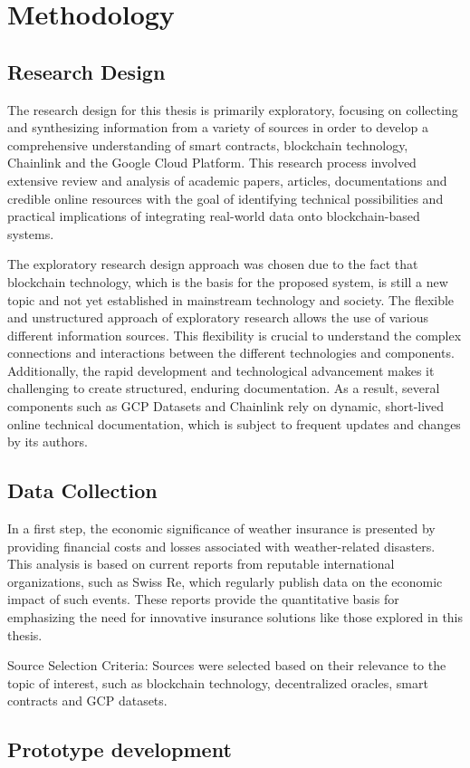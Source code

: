 \chapter{Methodology}\label{chapter:methodology}
\section{Research Design}\label{section:research_design}

The research design for this thesis is primarily exploratory, focusing on collecting and synthesizing information from a variety of sources in order to develop a comprehensive understanding of smart contracts, blockchain technology, Chainlink and the Google Cloud Platform. This research process involved extensive review and analysis of academic papers, articles, documentations and credible online resources with the goal of identifying technical possibilities and practical implications of integrating real-world data onto blockchain-based systems.

The exploratory research design approach was chosen due to the fact that blockchain technology, which is the basis for the proposed system, is still a new topic and not yet established in mainstream technology and society. The flexible and unstructured approach of exploratory research allows the use of various different information sources. This flexibility is crucial to understand the complex connections and interactions between the different technologies and components. Additionally, the rapid development and technological advancement makes it challenging to create structured, enduring documentation. As a result, several components such as GCP Datasets and Chainlink rely on dynamic, short-lived online technical documentation, which is subject to frequent updates and changes by its authors. \autocite{kicsi2022exploratory}




\section{Data Collection}\label{section:data_collection}

In a first step, the economic significance of weather insurance is presented by providing financial costs and losses associated with weather-related disasters. This analysis is based on current reports from reputable international organizations, such as Swiss Re, which regularly publish data on the economic impact of such events. These reports provide the quantitative basis for emphasizing the need for innovative insurance solutions like those explored in this thesis.

Source Selection Criteria: 
Sources were selected based on their relevance to the topic of interest, such as blockchain technology, decentralized oracles, smart contracts and GCP datasets. 


\section{Prototype development}\label{section:prototype_development}